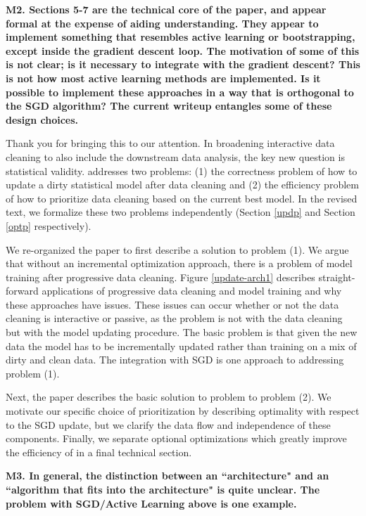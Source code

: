 \vspace{0.5em}

\noindent\textbf{M2. Sections 5-7 are the technical core of the paper, and appear formal at the expense of aiding understanding. They appear to implement something that resembles active learning or bootstrapping, except inside the gradient descent loop. The motivation of some of this is not clear; is it necessary to integrate with the gradient descent? This is not how most active learning methods are implemented. Is it possible to implement these approaches in a way that is orthogonal to the SGD algorithm? The current writeup entangles some of these design choices.} 

Thank you for bringing this to our attention. 
In broadening interactive data cleaning to also include the downstream data analysis, the key new question is statistical validity.
\sys addresses two problems: (1) the correctness problem of how to update a dirty statistical model after data cleaning and (2) the efficiency problem of how to prioritize data cleaning based on the current best model.
In the revised text, we formalize these two problems independently (Section \ref{updp} and Section \ref{optp} respectively).

We re-organized the paper to first describe a solution to problem (1). We argue that without an incremental optimization approach, there is a problem of model training after progressive data cleaning. Figure \ref{update-arch1} describes straight-forward applications of progressive data cleaning and model training and why these approaches have issues.
These issues can occur whether or not the data cleaning is interactive or passive, as the problem is not with the data cleaning but with the model updating procedure.
The basic problem is that given the new data the model has to be incrementally updated rather than training on a mix of dirty and clean data.
The integration with SGD is one approach to addressing problem (1).

Next, the paper describes the basic solution to problem to problem (2). We motivate our specific choice of prioritization by describing optimality with respect to the SGD update, but we clarify the data flow and independence of these components. 
Finally, we separate optional optimizations which greatly improve the efficiency of \sys in a final technical section.

\vspace{0.5em}

\noindent\textbf{M3. In general, the distinction between an ``architecture" and an ``algorithm that fits into the architecture" is quite unclear. The problem with SGD/Active Learning above is one example.}

